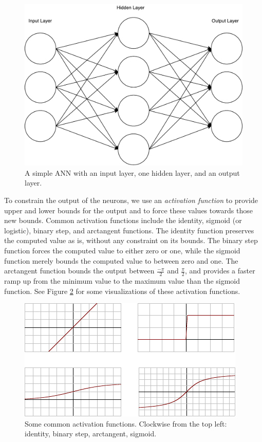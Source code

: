 \begin{figure}
	\centering
	\includegraphics[width=\textwidth]{figures/ann.pdf}
	\caption{A simple ANN with an input layer, one hidden layer, and an output layer.}
	\label{fig:ann}
\end{figure}

To constrain the output of the neurons, we use an \textit{activation function} to provide upper and lower bounds for the output and to force these values towards those new bounds.
Common activation functions include the identity, sigmoid (or logistic), binary step, and arctangent functions.
The identity function preserves the computed value as is, without any constraint on its bounds.
The binary step function forces the computed value to either zero or one, while the sigmoid function merely bounds the computed value to between zero and one.
The arctangent function bounds the output between $\frac{-\pi}{2}$ and $\frac{\pi}{2}$, and provides a faster ramp up from the minimum value to the maximum value than the sigmoid function.
See Figure \ref{fig:activation_functions} for some visualizations of these activation functions.

\begin{figure}
	\centering
	\includegraphics{figures/activation_functions.pdf}
	\caption{Some common activation functions. Clockwise from the top left: identity, binary step, arctangent, sigmoid.}
	\label{fig:activation_functions}
\end{figure}

